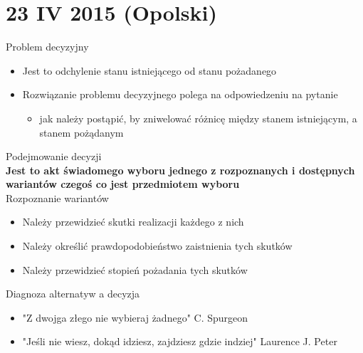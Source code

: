 \documentclass[a4paper,10pt]{report}
\begin{document}
\section{23 IV 2015 (Opolski)}

\noindent Problem decyzyjny
\begin{itemize}
	\item Jest to odchylenie stanu istniejącego od stanu pożadanego
	\item Rozwiązanie problemu decyzyjnego polega na odpowiedzeniu na pytanie
	\begin{itemize}
		\item jak należy postąpić, by zniwelować różnicę między stanem istniejącym, a stanem pożądanym
	\end{itemize}
\end{itemize}

Podejmowanie decyzji\\
\textbf{Jest to akt świadomego wyboru jednego z rozpoznanych i dostępnych wariantów czegoś co jest przedmiotem wyboru}
\\
\noindent Rozpoznanie wariantów
\begin{itemize}
	\item Należy przewidzieć skutki realizacji każdego z nich
	\item Należy określić prawdopodobieństwo zaistnienia tych skutków
	\item Należy przewidzieć stopień pożadania tych skutków
\end{itemize}

\noindent Diagnoza alternatyw a decyzja
\begin{itemize}
	\item "Z dwojga złego nie wybieraj żadnego" C. Spurgeon
	\item "Jeśli nie wiesz, dokąd idziesz, zajdziesz gdzie indziej" Laurence J. Peter
\end{itemize}
\end{document}
